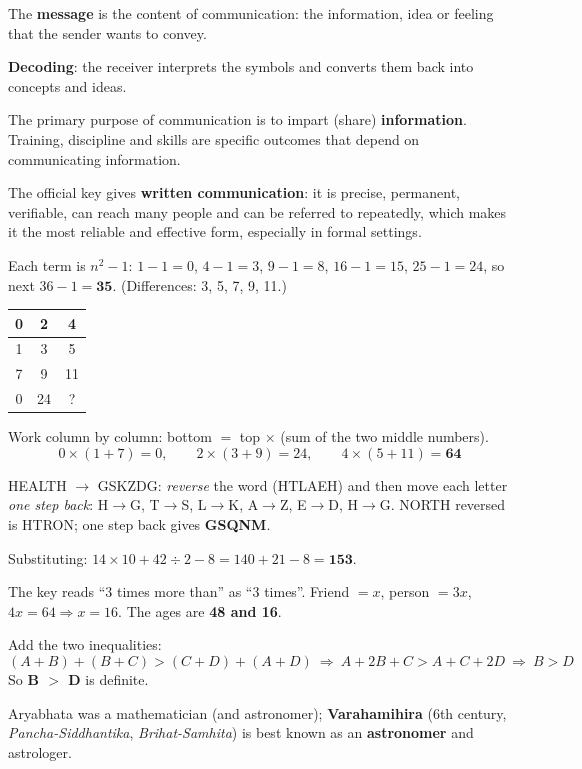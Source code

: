 The \textbf{message} is the content of communication: the information, idea or feeling that the sender wants to convey.

\textbf{Decoding}: the receiver interprets the symbols and converts them back into concepts and ideas.

The primary purpose of communication is to impart (share) \textbf{information}. Training, discipline and skills are specific outcomes that depend on communicating information.

The official key gives \textbf{written communication}: it is precise, permanent, verifiable, can reach many people and can be referred to repeatedly, which makes it the most reliable and effective form, especially in formal settings.

Each term is $n^2-1$: $1-1=0$, $4-1=3$, $9-1=8$, $16-1=15$, $25-1=24$, so next $36-1=\mathbf{35}$. (Differences: 3, 5, 7, 9, 11.)

\begin{tabular}{|c|c|c|}\hline 0 & 2 & 4\\\hline 1 & 3 & 5\\\hline 7 & 9 & 11\\\hline 0 & 24 & ?\\\hline\end{tabular}

Work column by column: bottom $=$ top $\times$ (sum of the two middle numbers).
\[0\times(1+7)=0,\qquad 2\times(3+9)=24,\qquad 4\times(5+11)=\mathbf{64}\]

HEALTH $\rightarrow$ GSKZDG: \emph{reverse} the word (HTLAEH) and then move each letter \emph{one step back}: H$\rightarrow$G, T$\rightarrow$S, L$\rightarrow$K, A$\rightarrow$Z, E$\rightarrow$D, H$\rightarrow$G.
NORTH reversed is HTRON; one step back gives \textbf{GSQNM}.

Substituting: $14\times10+42\div2-8=140+21-8=\mathbf{153}$.

The key reads ``3 times more than'' as ``3 times''. Friend $=x$, person $=3x$, $4x=64\Rightarrow x=16$. The ages are \textbf{48 and 16}.

Add the two inequalities:
\[(A+B)+(B+C)>(C+D)+(A+D)\ \Rightarrow\ A+2B+C>A+C+2D\ \Rightarrow\ B>D\]
So \textbf{B $>$ D} is definite.

Aryabhata was a mathematician (and astronomer); \textbf{Varahamihira} (6th century, \emph{Pancha-Siddhantika}, \emph{Brihat-Samhita}) is best known as an \textbf{astronomer} and astrologer.

